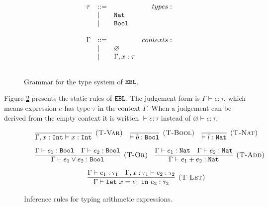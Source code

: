 \begin{figure}[h]

\[
\begin{array}{c}

\begin{array}{lllr}

\tau & ::= & ~ & types: \\
	& | & \mathtt{Nat} \\
	& | & \mathtt{Bool} \\
	&&\\
	
\Gamma & ::= & ~ & contexts: \\
	& | & \varnothing \\
	& | & \Gamma, x: \tau \\
	&&\\
\end{array}

\end{array}
\]

\vspace{-12pt}
\caption{Grammar for the type system of $\mathtt{EBL}$.}
\label{fig:calc_types}
\end{figure}

Figure \ref{fig:ebl_static} presents the static rules of $\mathtt{EBL}$. The judgement form is $\Gamma \vdash e: \tau$, which means expression $e$ has type $\tau$ in the context $\Gamma$. When a judgement can be derived from the empty context it is written $\vdash e: \tau$ instead of $\varnothing \vdash e: \tau$.

\begin{figure}[h]

\noindent
{}

\[
\begin{array}{c}

\infer[\textsc{(T-Var)}]
	{\Gamma, x: \kwa{Int} \vdash x: \kwa{Int}}
	{}
~~~
\infer[\textsc{(T-Bool)}]
	{\vdash b : \Bool}
	{}
	~~~
\infer[\textsc{(T-Nat)}]
	{\vdash l : \Nat}
	{}\\[2ex]

	~~~
\infer[\textsc{(T-Or)}]
	{\Gamma \vdash e_1 \lor e_2 : \Bool}
	{\Gamma \vdash e_1: \Bool & \Gamma \vdash e_2: \Bool}
	~~~
\infer[\textsc{(T-Add)}]
	{\Gamma \vdash e_1 + e_2 : \Nat}
	{\Gamma \vdash e_1: \Nat & \Gamma \vdash e_2: \Nat} \\[2ex]
	
\infer[\textsc{(T-Let)}]
	{\Gamma \vdash \letxpr{x}{e_1}{e_2} : \tau_2}
	{\Gamma \vdash e_1: \tau_1 & \Gamma, x: \tau_1 \vdash e_2: \tau_2}
	
	
\end{array}
\]

\vspace{-12pt}
\caption{Inference rules for typing arithmetic expressions.}
\label{fig:ebl_static}
\end{figure}

